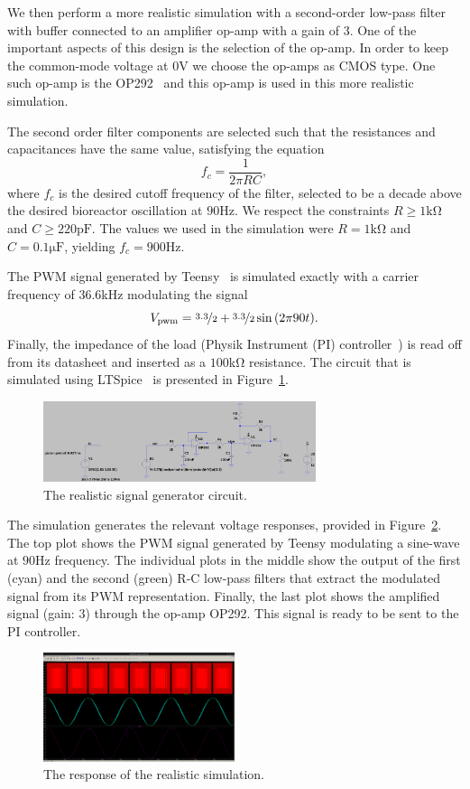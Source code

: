 We then perform a more realistic simulation with a second-order low-pass filter
with buffer connected to an amplifier op-amp with a gain of $3$. One of the
important aspects of this design is the selection of the op-amp. In order to
keep the common-mode voltage at $0$\unit{\volt} we choose the op-amps as CMOS
type. One such op-amp is the OP292~ and this op-amp is used in this
more realistic simulation.

The second order filter components are selected such that the resistances and
capacitances have the same value, satisfying the equation \[ f_c = \frac{1}{2\pi
RC}, \] where $f_c$ is the desired cutoff frequency of the filter, selected to
be a decade above the desired bioreactor oscillation at $90$\unit{\hertz}. We
respect the constraints $R \geq 1\unit{\kilo\ohm}$ and $C \geq
220\unit{\pico\farad}$. The values we used in the simulation were $R =
1\unit{\kilo\ohm}$ and $C = 0.1\unit{\micro\farad}$, yielding $f_c =
900\unit{\hertz}$.

The PWM signal generated by Teensy~ is simulated exactly
with a carrier frequency of $36.6$\unit{\kilo\hertz} modulating the signal \[
V_{\text{pwm}} = \nicefrac{3.3}{2} + \nicefrac{3.3}{2}\sin{(2\pi 90 t)}.\]
Finally, the impedance of the load (Physik Instrument (PI)
controller~) is read off from its datasheet and inserted as a
$100$\unit{\kilo\ohm} resistance. The circuit that is simulated using
LTSpice~ is presented in Figure~\ref{fig:real_sig_gen}.

\begin{figure}[htb]
\includegraphics[width=8cm]{./figures/circuit.png}
\caption{The realistic signal generator circuit.}
\label{fig:real_sig_gen}
\end{figure}

The simulation generates the relevant voltage responses, provided in
Figure~\ref{fig:response}. The top plot shows the PWM signal generated by Teensy
modulating a sine-wave at $90$\unit{\hertz} frequency. The individual plots in
the middle show the output of the first (cyan) and the second (green) R-C
low-pass filters that extract the modulated signal from its PWM representation.
Finally, the last plot shows the amplified signal (gain: $3$) through the op-amp
OP292. This signal is ready to be sent to the PI controller.

\begin{figure}[t]
\includegraphics[width=0.5\textwidth]{./figures/pwm_filtered_one_two_final_signal.png}
\caption{The response of the realistic simulation.}
\label{fig:response}
\end{figure}
